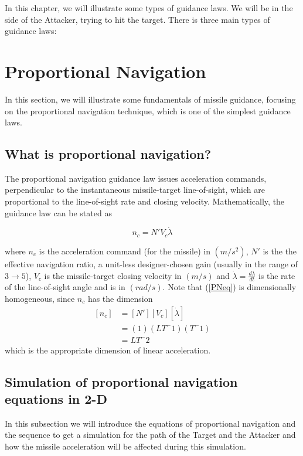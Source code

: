 In this chapter, we will illustrate some types of guidance laws. We will be in the side of the Attacker, trying to hit the target. There is three main types of guidance laws:

\section{Proportional Navigation}
In this section, we will illustrate some fundamentals of missile guidance, focusing on the proportional navigation technique, which is one of the simplest guidance laws.

\subsection*{What is proportional navigation?}
The proportional navigation guidance law issues acceleration commands,
perpendicular to the instantaneous missile-target line-of-sight, which are
proportional to the line-of-sight rate and closing velocity. Mathematically, the
guidance law can be stated as

\begin{equation}
n_c= N' V_c \dot{\lambda}
\label{PNeq}
\end{equation}

where $n_c$ is the acceleration command (for the missile) in $(m/s^2)$, $N'$ is the the effective navigation ratio, a unit-less designer-chosen gain (usually in the range of $3 \to 5$), $V_c$ is the missile-target closing velocity in $(m/s)$ and $\dot{\lambda} = \frac{d\lambda}{dt}$ is the rate of the line-of-sight angle and is in $(rad/s)$. Note that (\ref{PNeq}) is dimensionally homogeneous, since $n_c$ has the dimension
\begin{equation}
\begin{split}
[n_c] &= [N'] [V_c] [\dot{\lambda}]\\
&=(1) (LT^-1) (T^-1)\\
&=LT^-2
\end{split}
\label{PN dimensionallity}
\end{equation}
which is the appropriate dimension of linear acceleration.

\subsection{Simulation of proportional navigation equations in 2-D}
In this subsection we will introduce the equations of proportional navigation and the sequence to get a simulation for the path of the Target and the Attacker and how the missile acceleration will be affected during this simulation.

